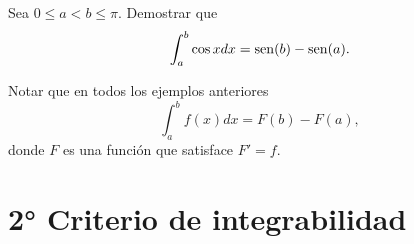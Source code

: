 \begin{ejercicio}{} Sea $0\leq a<b\leq \pi$. Demostrar que
\[
 \int_a^b \cos x dx=\operatorname{sen}(b)-\operatorname{sen}(a).
\]
\end{ejercicio}


\begin{observa} Notar que en todos los ejemplos anteriores
\[
 \int_a^bf(x)dx=F(b)-F(a),
\]
donde $F$ es una función que satisface $F'=f$.
\end{observa}

% 
% 
% 
% 
% 
% 
%  




\section{2° Criterio de integrabilidad}


